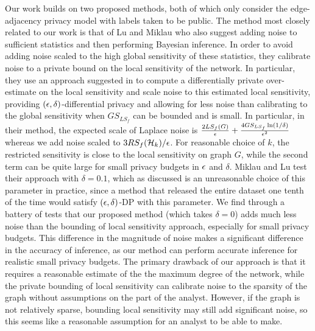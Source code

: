 Our work builds on two proposed methods, both of which only consider the edge-adjacency privacy model with labels taken to be public. The method most closely related to our work is that of Lu and Miklau \cite{LM14} who also suggest adding noise to sufficient statistics and then performing Bayesian inference. In order to avoid adding noise scaled to the high global sensitivity of these statistics, they calibrate noise to a private bound on the local sensitivity of the network. In particular, they use an approach suggested in \cite{KRSY14} to compute a differentially private over-estimate on the local sensitivity and scale noise to this estimated local sensitivity, providing $(\epsilon, \delta)$-differential privacy and allowing for less noise than calibrating to the global sensitivity when  $GS_{LS_f}$ can be bounded and is small. In particular, in their method, the expected scale of Laplace noise is $\frac{2 LS_f(G)}{\epsilon} + \frac{4 GS_{LS_f} \ln (1/\delta)}{\epsilon^2}$ whereas we add noise scaled to $3RS_f(\mathcal{H}_k)/\epsilon$. For reasonable choice of $k$, the restricted sensitivity is close to the local sensitivity on graph $G$, while the second term can be quite large for small privacy budgets in $\epsilon$ and $\delta$. Miklau and Lu test their approach with $\delta = 0.1$, which as discussed is an unreasonable choice of this parameter in practice, since a method that released the entire dataset one tenth of the time would satisfy $(\epsilon, \delta)$-DP with this parameter. We find through a battery of tests that our proposed method (which takes $\delta = 0$) adds much less noise than the bounding of local sensitivity approach, especially for small privacy budgets. This difference in the magnitude of noise makes a significant difference in the accuracy of inference, as our method can perform accurate inference for realistic small privacy budgets. The primary drawback of our approach is that it requires a reasonable estimate of the the maximum degree of the network, while the private bounding of local sensitivity can calibrate noise to the sparsity of the graph without assumptions on the part of the analyst. However, if the graph is not relatively sparse, bounding local sensitivity may still add significant noise, so this seems like a reasonable assumption for an analyst to be able to make.


